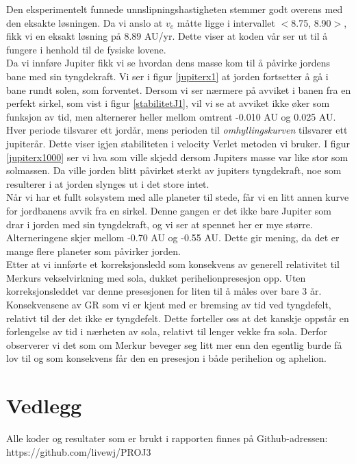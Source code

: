 \documentclass[11pt,a4paper]{article}
\begin{document}
Den eksperimentelt funnede unnslipningshastigheten stemmer godt overens med den eksakte løsningen. Da vi anslo at $v_e$ måtte ligge i intervallet $<$8.75, 8.90$>$, fikk vi en eksakt løsning på $8.89$ AU/yr. Dette viser at koden vår ser ut til å fungere i henhold til de fysiske lovene.\\

Da vi innføre Jupiter fikk vi se hvordan dens masse kom til å påvirke jordens bane med sin tyngdekraft. Vi ser i figur \ref{jupiterx1} at jorden fortsetter å gå i bane rundt solen, som forventet. Dersom vi ser nærmere på avviket i banen fra en perfekt sirkel, som vist i figur \ref{stabilitetJ1}, vil vi se at avviket ikke øker som funksjon av tid, men alternerer heller mellom omtrent -0.010 AU og 0.025 AU. Hver periode tilsvarer ett jordår, mens perioden til \textit{omhyllingskurven} tilsvarer ett jupiterår. Dette viser igjen stabiliteten i velocity Verlet metoden vi bruker. I figur \ref{jupiterx1000} ser vi hva som ville skjedd dersom Jupiters masse var like stor som solmassen. Da ville jorden blitt påvirket sterkt av jupiters tyngdekraft, noe som resulterer i at jorden slynges ut i det store intet. \\

Når vi har et fullt solsystem med alle planeter til stede, får vi en litt annen kurve for jordbanens avvik fra en sirkel. Denne gangen er det ikke bare Jupiter som drar i jorden med sin tyngdekraft, og vi ser at spennet her er mye større. Alterneringene skjer mellom -0.70 AU og -0.55 AU. Dette gir mening, da det er mange flere planeter som påvirker jorden.\\

Etter at vi innførte et korreksjonsledd som konsekvens av generell relativitet til Merkurs vekselvirkning med sola, dukket perihelionpresesjon opp. Uten korreksjonsleddet var denne presesjonen for liten til å måles over bare 3 år. Konsekvensene av GR som vi er kjent med er bremsing av tid ved tyngdefelt, relativt til der det ikke er tyngdefelt. Dette forteller oss at det kanskje oppstår en forlengelse av tid i nærheten av sola, relativt til lenger vekke fra sola. Derfor observerer vi det som om Merkur beveger seg litt mer enn den egentlig burde få lov til og som konsekvens får den en presesjon i både perihelion og aphelion.


\section{Vedlegg}
Alle koder og resultater som er brukt i rapporten finnes på Github-adressen: \\
https://github.com/livewj/PROJ3
\end{document}

